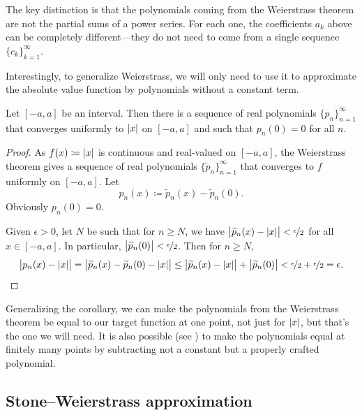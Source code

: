 The key distinction is that
the polynomials coming from the Weierstrass theorem are not the partial
sums of a power series.  For each one, the coefficients $a_k$ above can be
completely different---they do not need to come from a single sequence
$\{ c_k \}_{k=1}^\infty$.

\medskip

Interestingly, to generalize Weierstrass, we will only need to use it to
approximate the absolute value function by polynomials without
a constant term.

\begin{cor}
Let $[-a,a]$ be an interval.  Then there is a sequence of real polynomials
$\{ p_n \}_{n=1}^\infty$ that converges uniformly to $\lvert {x} \rvert$ on $[-a,a]$ and such that
$p_n(0) = 0$ for all $n$.
\end{cor}

\begin{proof}
As $f(x) \coloneqq \lvert {x} \rvert$ is continuous and real-valued
on $[-a,a]$, the Weierstrass theorem gives a sequence of
real polynomials $\{ \widetilde{p}_n \}_{n=1}^\infty$ that converges to $f$
uniformly on $[-a,a]$.
Let
\begin{equation*}
p_n(x) \coloneqq \widetilde{p}_n(x) - \widetilde{p}_n(0) .
\end{equation*}
Obviously $p_n(0) = 0$.

Given $\epsilon > 0$, let $N$ be such that
for $n \geq N$, we have
$\bigl\lvert\widetilde{p}_n(x)-\lvert {x} \rvert\big\rvert <
\nicefrac{\epsilon}{2}$ for all $x \in [-a,a]$.
In particular,
$\bigl\lvert {\widetilde{p}_n(0)} \bigr\rvert < \nicefrac{\epsilon}{2}$.
Then for $n \geq N$,
\begin{equation*}
\bigl\lvert { p_n(x)-\lvert {x} \rvert } \bigr\rvert
=
\bigl\lvert { \widetilde{p}_n(x) - \widetilde{p}_n(0) - \lvert {x} \rvert } \bigr\rvert
\leq
\bigl\lvert { \widetilde{p}_n(x) - \lvert {x} \rvert } \bigr\rvert + \bigl\lvert {\widetilde{p}_n(0)} \bigr\rvert < 
\nicefrac{\epsilon}{2} + \nicefrac{\epsilon}{2} = \epsilon . \qedhere
\end{equation*}
\end{proof}

Generalizing the corollary,
we can make the polynomials from the Weierstrass theorem
be equal to our target function at one point, not just for $\lvert {x} \rvert$, but
that's the one we will need.  It is also possible (see
)
to make the polynomials
equal at finitely many points by subtracting not a constant but a properly
crafted polynomial.

\subsection{Stone--Weierstrass approximation}

